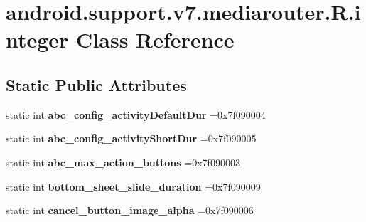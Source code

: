 \hypertarget{classandroid_1_1support_1_1v7_1_1mediarouter_1_1R_1_1integer}{}\section{android.\+support.\+v7.\+mediarouter.\+R.\+integer Class Reference}
\label{classandroid_1_1support_1_1v7_1_1mediarouter_1_1R_1_1integer}
\subsection*{Static Public Attributes}
\begin{DoxyCompactItemize}
\item 
\mbox{\label{classandroid_1_1support_1_1v7_1_1mediarouter_1_1R_1_1integer_a48040723652e47712319e3319a83923d}} 
static int {\bfseries abc\+\_\+config\+\_\+activity\+Default\+Dur} =0x7f090004
\item 
\mbox{\label{classandroid_1_1support_1_1v7_1_1mediarouter_1_1R_1_1integer_aebd64626757351e3f0f9191ab5cd1c0e}} 
static int {\bfseries abc\+\_\+config\+\_\+activity\+Short\+Dur} =0x7f090005
\item 
\mbox{\label{classandroid_1_1support_1_1v7_1_1mediarouter_1_1R_1_1integer_a19e3b39c584107f75f442a004b0e89f6}} 
static int {\bfseries abc\+\_\+max\+\_\+action\+\_\+buttons} =0x7f090003
\item 
\mbox{\label{classandroid_1_1support_1_1v7_1_1mediarouter_1_1R_1_1integer_a36701579a5300f9a67e113667562c329}} 
static int {\bfseries bottom\+\_\+sheet\+\_\+slide\+\_\+duration} =0x7f090009
\item 
\mbox{\label{classandroid_1_1support_1_1v7_1_1mediarouter_1_1R_1_1integer_a36b1df60e6116deccb90f02bf7ae1b00}} 
static int {\bfseries cancel\+\_\+button\+\_\+image\+\_\+alpha} =0x7f090006
\item 
\mbox{\label{classandroid_1_1support_1_1v7_1_1mediarouter_1_1R_1_1integer_a66a8d4d478c79273609f16101673a7c8}} 

\end{DoxyCompactItemize}
